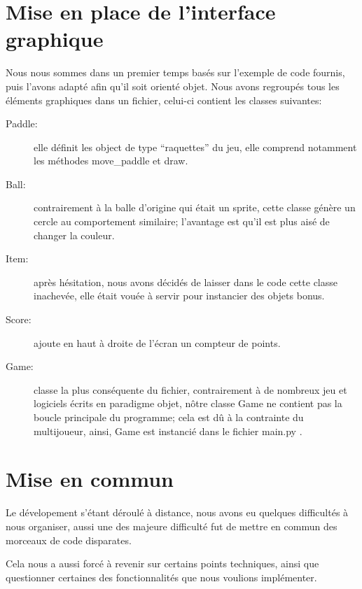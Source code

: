 \documentclass[12pt]{report}
\begin{document}
\chapter{Mise en place de l'interface graphique}
Nous nous sommes dans un premier temps basés sur l'exemple de code
fournis, puis l'avons adapté afin qu'il soit orienté objet. Nous avons
regroupés tous les éléments graphiques dans un fichier, celui-ci
contient les classes suivantes:

\begin{description}
  \item [Paddle:] elle définit les object de type ``raquettes'' du jeu, elle
    comprend notamment les méthodes move_paddle et draw.
  \item [Ball:] contrairement à la balle d'origine qui était un
    sprite, cette classe génère un cercle au comportement similaire;
    l'avantage est qu'il est plus aisé de changer la couleur.
  \item [Item: ] après hésitation, nous avons décidés de laisser dans
    le code cette classe inachevée, elle était vouée à servir pour
    instancier des objets bonus.
  \item [Score: ] ajoute en haut à droite de l'écran un compteur de
    points.
  \item [Game: ] classe la plus conséquente du fichier,
    contrairement à de nombreux jeu et logiciels écrits en paradigme
    objet, nôtre classe Game ne contient pas la boucle principale du
    programme; cela est dû à la contrainte du multijoueur, ainsi, Game
    est instancié dans le fichier main.py .
\end{description}


\chapter{Mise en commun}
Le dévelopement s'étant déroulé à distance, nous avons eu quelques
difficultés à nous organiser, aussi une des majeure difficulté fut de
mettre en commun des morceaux de code disparates.

Cela nous a aussi forcé à revenir sur certains points techniques,
ainsi que questionner certaines des fonctionnalités que nous voulions
implémenter.
\end{document}
